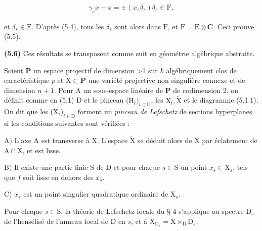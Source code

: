 \documentclass[10pt,leqno]{article}
\begin{document}
\begin{equation*}\begin{gathered}\gamma _{s} x- x = \pm (x,\delta _{s})\delta _{s} \in  \mathrm{F},\end{gathered}\end{equation*}

\noindent et \(\delta _{s}\in \mathrm{F}\). D’après (5.4), tous les \(\delta _{s}\) sont alors dans \(\mathrm{F}\), et \(\mathrm{F}=\mathrm{E}\otimes \mathbf{C}\). Ceci prouve (5.5).\par

\noindent \textbf{(5.6)} Ces résultats se transposent comme suit en géométrie algébrique abstraite.\par

\noindent Soient \(\mathbf{P}\) un espace projectif de dimension >1 sur \(k\) algébriquement clos de caractéristique \(p\) et \(\mathrm{X}\subset \mathbf{P}\) une variété projective non singulière connexe et de dimension \(n+1\). Pour \(\mathrm{A}\) un sous-espace linéaire de \(\mathbf{P}\) de codimension 2, on définit comme en (5.1) D et le pinceau (\(\mathrm{H}_{t})_{t\in \mathrm{D}}\), les \(\mathrm{X}_{t}, \widetilde{\mathrm{X}}\) et le diagramme (5.1.1). On dit que les (\(\mathrm{X}_{t})_{t\in \mathrm{D}}\) forment un \emph{pinceau de Lefschetz} de sections hyperplanes si les conditions suivantes sont vérifiées :\par

\noindent \(\mathrm{A})\) L’axe \(\mathrm{A}\) est transverse à \(\mathrm{X}\). L’espace \(\widetilde{\mathrm{X}}\) se déduit alors de \(\mathrm{X}\) par éclatement de \(\mathrm{A}\cap \mathrm{X}\), et est lisse.\par

\clearpage

\label{physical-21}

\noindent \(\mathrm{B})\) Il existe une partie finie \(\mathrm{S}\) de \(\mathrm{D}\) et pour chaque \(s\in \mathrm{S}\) un point \(x_{s}\in \mathrm{X}_{s}\), tels que \(f\) soit lisse en dehors des \(x_{s}\).\par

\noindent C) \(x_{s}\) est un point singulier quadratique ordinaire de \(\mathrm{X}_{s}\).\par

\noindent Pour chaque \(s\in \mathrm{S}\), la théorie de Lefschetz locale du § 4 s’applique au spectre \(\mathrm{D}_{s}\) de l’hensélisé de l’anneau local de \(\mathrm{D}\) en \(s\), et à \(\widetilde{\mathrm{X}}_{\mathrm{D}_{s}}=\widetilde{\mathrm{X}}\times _{\mathrm{D}} \mathrm{D}_{s}\).\par
\end{document}
